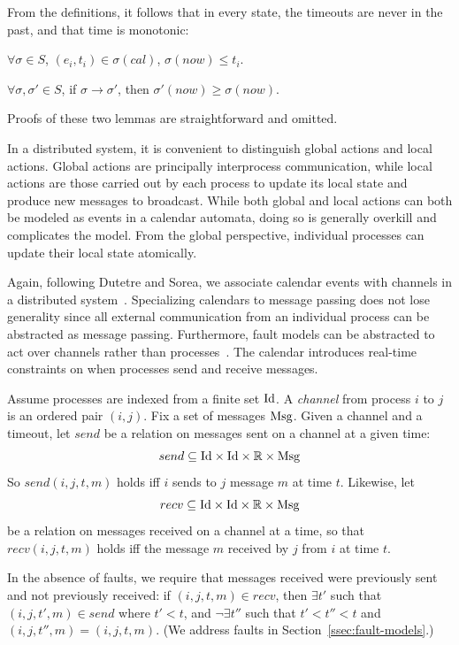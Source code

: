 From the definitions, it follows that in every state, the timeouts are
never in the past, and that time is monotonic:

\begin{lemma}\label{lem:ft} $\forall \sigma \in S$,
$(e_i, t_i) \in \sigma(cal)$, $\sigma(now) \leq t_i$.  \end{lemma}

\begin{lemma} $\forall \sigma, \sigma' \in S$, if
$\sigma \rightarrow \sigma'$, then $\sigma'(now) \geq \sigma(now)$.
\end{lemma}

Proofs of these two lemmas are straightforward and omitted.

In a distributed system, it is convenient to distinguish global actions
and local actions. Global actions are principally interprocess
communication, while local actions are those carried out by each process
to update its local state and produce new messages to broadcast. While
both global and local actions can both be modeled as events in a
calendar automata, doing so is generally overkill and complicates the
model. From the global perspective, individual processes can update
their local state atomically.

Again, following Dutetre and Sorea, we associate calendar events with
channels in a distributed system~\cite{Dutertre-Sorea-2004}. Specializing calendars to
message passing does not lose generality since all external
communication from an individual process can be abstracted as message
passing. Furthermore, fault models can be abstracted to act over
channels rather than processes~\cite{abstractions}. The calendar
introduces real-time constraints on when processes send and receive
messages.

Assume processes are indexed from a finite set $\mathrm{Id}$. A \emph{channel}
from process $i$ to $j$ is an ordered pair $(i,j)$. Fix a set of
messages $\mathrm{Msg}$. Given a channel and a timeout, let $send$ be a relation
on messages sent on a channel at a given time: $$send \subseteq \mathrm{Id}
\times \mathrm{Id} \times \mathbb{R} \times \mathrm{Msg}$$ So $send(i, j, t, m)$ holds
iff $i$ sends to $j$ message $m$ at time $t$. Likewise, let $$recv
\subseteq \mathrm{Id} \times \mathrm{Id} \times \mathbb{R} \times \mathrm{Msg}$$ be a relation
on messages received on a channel at a time, so that $recv(i, j, t, m)$
holds iff the message $m$ received by $j$ from $i$ at time $t$.

In the absence of faults, we require that messages received were
previously sent and not previously received: if $(i, j, t, m) \in recv$,
then $\exists t'$ such that $(i, j, t', m) \in send$ where $t' < t$, and
$\neg\exists t''$ such that $t' < t'' < t$ and $(i, j, t'', m) = (i, j,
t, m)$. (We address faults in Section~\ref{ssec:fault-models}.)

